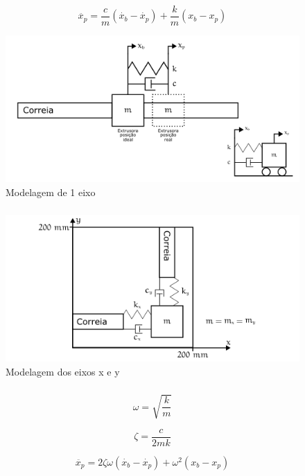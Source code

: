 \documentclass[aspectratio=169]{beamer}
\begin{document}
\begin{frame}
  \frametitle{\insertsubsection}
  \begin{equation}
    \label{eq:mov_impressora_2}
    \ddot{x_p} = \frac{c}{m}(\dot{x_b} - \dot{x_p}) + \frac{k}{m}(x_b - x_p) 
  \end{equation}
  \begin{figure}[H]
    \centering
    \caption{Modelagem de 1 eixo}
    \includegraphics[width=.7\textwidth]{model_1_axis}

    \label{fig:model_1_axis}
  \end{figure}
\end{frame}

\begin{frame}
  \frametitle{\insertsubsection}
  \begin{figure}[H]
    \centering
    \caption{Modelagem dos eixos x e y}
    \includegraphics[scale=0.4]{model_2_axis}

    \label{fig:model_2_axis}
  \end{figure}
\end{frame}

\begin{frame}
  \frametitle{\insertsubsection}
  
  \begin{equation}
    \label{eq:freq_nat}
    \omega = \sqrt{\frac{k}{m}}
  \end{equation}
  
  \begin{equation}
    \label{eq:amort}
    \zeta = \frac{c}{2mk}
  \end{equation}
  
  \begin{equation}
    \label{eq:equation_simpl}
    \ddot{x_p} = 2 \zeta \omega(\dot{x_b} - \dot{x_p}) + \omega ^2(x_b - x_p)
  \end{equation}
\end{frame}
\end{document}
